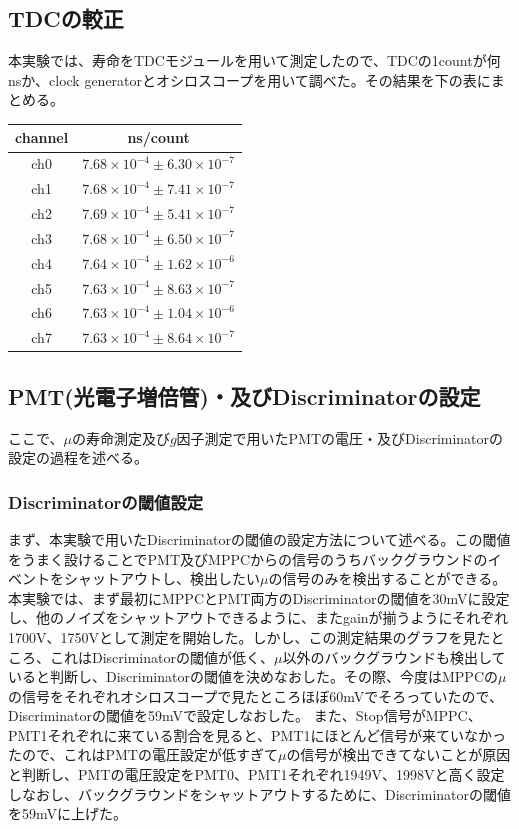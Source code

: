 \subsection{TDCの較正}
本実験では、寿命をTDCモジュールを用いて測定したので、TDCの1countが何nsか、clock generatorとオシロスコープを用いて調べた。その結果を下の表にまとめる。
\begin{table}[H]
  \begin{center}
    \begin{tabular}{c|c} \hline
      channel & ns/count \\ \hline
      ch0 &  $7.68\times 10^{-4}\pm 6.30\times 10^{-7}$ \\
      ch1 &  $7.68\times 10^{-4}\pm 7.41\times 10^{-7}$ \\
      ch2 &  $7.69\times 10^{-4}\pm 5.41\times 10^{-7}$ \\
      ch3 &  $7.68\times 10^{-4}\pm 6.50\times 10^{-7}$ \\
      ch4 &  $7.64\times 10^{-4}\pm 1.62\times 10^{-6}$ \\
      ch5 &  $7.63\times 10^{-4}\pm 8.63\times 10^{-7}$ \\
      ch6 &  $7.63\times 10^{-4}\pm 1.04\times 10^{-6}$ \\
      ch7 &  $7.63\times 10^{-4}\pm 8.64\times 10^{-7}$ \\
    \end{tabular}
  \end{center}
\end{table}
\subsection{PMT(光電子増倍管)・及びDiscriminatorの設定}
ここで、$\mu$の寿命測定及び$g$因子測定で用いたPMTの電圧・及びDiscriminatorの設定の過程を述べる。
\subsubsection{Discriminatorの閾値設定}
まず、本実験で用いたDiscriminatorの閾値の設定方法について述べる。この閾値をうまく設けることでPMT及びMPPCからの信号のうちバックグラウンドのイベントをシャットアウトし、検出したい$\mu$の信号のみを検出することができる。
本実験では、まず最初にMPPCとPMT両方のDiscriminatorの閾値を30mVに設定し、他のノイズをシャットアウトできるように、またgainが揃うようにそれぞれ1700V、1750Vとして測定を開始した。しかし、この測定結果のグラフを見たところ、これはDiscriminatorの閾値が低く、$\mu$以外のバックグラウンドも検出していると判断し、Discriminatorの閾値を決めなおした。その際、今度はMPPCの$\mu$の信号をそれぞれオシロスコープで見たところほぼ60mVでそろっていたので、Discriminatorの閾値を59mVで設定しなおした。
また、Stop信号がMPPC、PMT1それぞれに来ている割合を見ると、PMT1にほとんど信号が来ていなかったので、これはPMTの電圧設定が低すぎて$\mu$の信号が検出できてないことが原因と判断し、PMTの電圧設定をPMT0、PMT1それぞれ1949V、1998Vと高く設定しなおし、バックグラウンドをシャットアウトするために、Discriminatorの閾値を59mVに上げた。
